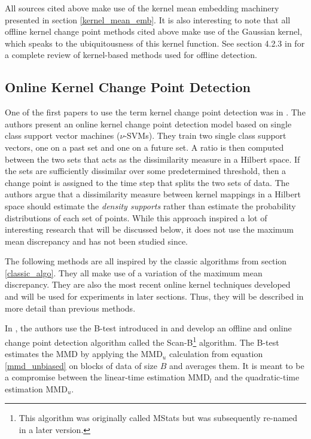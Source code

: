 All sources cited above make use of the kernel mean embedding machinery presented in section \ref{kernel_mean_emb}. It is also interesting to note that all offline kernel change point methods cited above make use of the Gaussian kernel, which speaks to the ubiquitousness of this kernel function. See section 4.2.3  in \cite{truong2018review} for a complete review of kernel-based methods used for offline detection. 

\subsection{Online Kernel Change Point Detection}
One of the first papers to use the term kernel change point detection was in \cite{desobry2005online}. The authors present an online kernel change point detection model based on single class support vector machines ($\nu$-SVMs). They train two single class support vectors, one on a past set and one on a future set. A ratio is then computed between the two sets that acts as the dissimilarity measure in a Hilbert space. If the sets are sufficiently dissimilar over some predetermined threshold, then a change point is assigned to the time step that splits the two sets of data. The authors argue that a dissimilarity measure between kernel mappings in a Hilbert space should estimate the \textit{density supports} rather than estimate the probability distributions of each set of points. While this approach inspired a lot of interesting research that will be discussed below, it does not use the maximum mean discrepancy and has not been studied since.

The following methods are all inspired by the classic algorithms from section \ref{classic_algo}. They all make use of a variation of the maximum mean discrepancy. They are also the most recent online kernel techniques developed and will be used for experiments in later sections. Thus, they will be described in more detail than previous methods.

In  \cite{li2015m}, the authors use the B-test introduced in \cite{zaremba2013b} and develop an offline and online change point detection algorithm called the Scan-B\footnote{This algorithm was originally called MStats but was subsequently re-named in a later version.} algorithm. The B-test estimates the MMD by applying the MMD$_u$ calculation from equation \ref{mmd_unbiased} on blocks of data of size $B$ and averages them. It is meant to be a compromise between the linear-time estimation MMD$_l$ and the quadratic-time estimation MMD$_u$.

